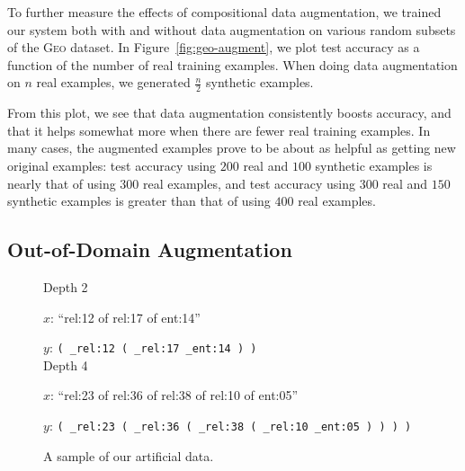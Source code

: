 \documentclass[11pt,letterpaper]{article}
\newcommand{\geo}{\textsc{Geo}\xspace}
\begin{document}
To further measure the effects of compositional data augmentation,
we trained our system both with and without data augmentation
on various random subsets of the \geo dataset.
In Figure~\ref{fig:geo-augment}, we plot test accuracy as a function of
the number of real training examples.
When doing data augmentation on $n$ real examples,
we generated $\frac{n}2$ synthetic examples.

From this plot, we see that data augmentation consistently boosts accuracy,
and that it helps somewhat more when there are fewer real training examples.
In many cases, the augmented examples prove to be
about as helpful as getting new original examples:
test accuracy using $200$ real and $100$ synthetic examples
is nearly that of using $300$ real examples,
and test accuracy using $300$ real and $150$ synthetic examples 
is greater than that of using $400$ real examples.

\subsection{Out-of-Domain Augmentation}
\begin{figure}[t] 
\small
\begin{framed}
\footnotesize
Depth 2

\quad $x$: ``rel:12 of rel:17 of ent:14''

\quad $y$: \texttt{( \_rel:12 ( \_rel:17 \_ent:14 ) )}\\
Depth 4

\quad $x$: ``rel:23 of rel:36 of rel:38 of rel:10 of ent:05''

\quad $y$: \texttt{( \_rel:23 ( \_rel:36 ( \_rel:38 ( \_rel:10 \_ent:05 ) ) ) )}

\end{framed}
\caption{A sample of our artificial data.}
\label{fig:artificial-data}
\end{figure}
\end{document}
